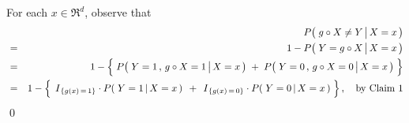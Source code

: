 \vskip 0.5cm
\noindent
For each $x \in \Re^{d}$, observe that
\begin{eqnarray*}
&&
	P\!\left(\,\left. \overset{{\color{white}.}}{g} \circ X \neq Y \,\right\vert X = x \,\right)
\\
&=&
	1 - P\!\left(\,\left. Y = \overset{{\color{white}.}}{g} \circ X \,\right\vert X = x \,\right)
\\
&=&
	1 - \left\{\;
		\overset{{\color{white}.}}{P}\!\left(\,\left. Y = 1 \,,\, \overset{{\color{white}.}}{g} \circ X = 1 \,\right\vert X = x \,\right)
		\; + \;
		P\!\left(\,\left. Y = 0 \,,\, \overset{{\color{white}.}}{g} \circ X = 0 \,\right\vert X = x \,\right)
		\;\right\}
\\
&=&
	1 - \left\{\;
		\,\overset{{\color{white}.}}{I}_{\{g(x)\,=\,1\}} \cdot P\!\left(\,\left. Y = 1 \,\right\vert X = x \,\right)\,
		\; + \;
		\,\overset{{\color{white}.}}{I}_{\{g(x)\,=\,0\}} \cdot P\!\left(\,\left. Y = 0 \,\right\vert X = x \,\right)
		\;\right\},
	\quad
	\textnormal{by Claim 1}
\end{eqnarray*}
\qed



\renewcommand{\theenumi}{\roman{enumi}}
\renewcommand{\labelenumi}{\textnormal{(\theenumi)}$\;\;$}

